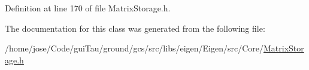 Definition at line 170 of file Matrix\-Storage.\-h.



The documentation for this class was generated from the following file\-:\begin{DoxyCompactItemize}
\item 
/home/jose/\-Code/gui\-Tau/ground/gcs/src/libs/eigen/\-Eigen/src/\-Core/\hyperlink{_matrix_storage_8h}{Matrix\-Storage.\-h}\end{DoxyCompactItemize}
